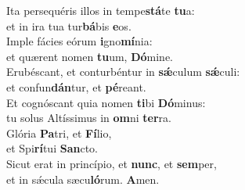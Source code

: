 \evenverse Ita persequéris illos in tempe\textbf{stá}te \textbf{tu}a:~\*\\
\evenverse et in ira tua tur\textbf{bá}bis \textbf{e}os.\\
\oddverse Imple fácies eórum \textbf{i}gno\textbf{mí}nia:~\*\\
\oddverse et quærent nomen \textbf{tu}um, \textbf{Dó}mine.\\
\evenverse Erubéscant, et conturbéntur in \textbf{sǽ}culum \textbf{sǽ}culi:~\*\\
\evenverse et confun\textbf{dán}tur, et \textbf{pé}reant.\\
\oddverse Et cognóscant quia nomen \textbf{ti}bi \textbf{Dó}minus:~\*\\
\oddverse tu solus Altíssimus in \textbf{om}ni \textbf{ter}ra.\\
\evenverse Glória \textbf{Pa}tri, et \textbf{Fí}lio,~\*\\
\evenverse et Spi\textbf{rí}tui \textbf{San}cto.\\
\oddverse Sicut erat in princípio, et \textbf{nunc}, et \textbf{sem}per,~\*\\
\oddverse et in sǽcula sæcu\textbf{ló}rum. \textbf{A}men.\\
